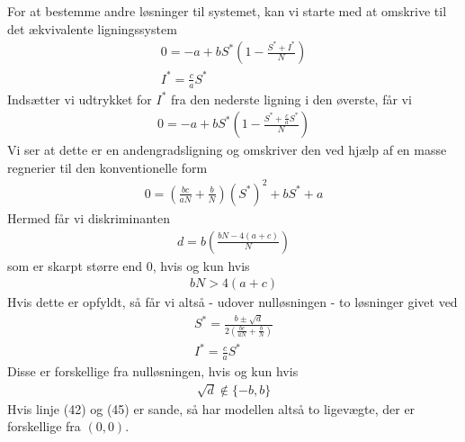 \documentclass[12pt]{article}
\begin{document}
For at bestemme andre løsninger til systemet, kan vi starte med at omskrive til det ækvivalente ligningssystem
\begin{align}
0 = -a + bS^*\left(1 - \frac{S^* + I^*}{N} \right)\\
I^* = \frac{c}{a}S^*
\end{align}
Indsætter vi udtrykket for $I^*$ fra den nederste ligning i den øverste, får vi
\begin{align}
0 = -a + bS^*\left(1 - \frac{S^* + \frac{c}{a}S^*}{N} \right)
\end{align}
Vi ser at dette er en andengradsligning og omskriver den ved hjælp af en masse regnerier til den konventionelle form
\begin{align}
0 = \left(\frac{bc}{aN} + \frac{b}{N} \right)(S^*)^2 + bS^* + a
\end{align}
Hermed får vi diskriminanten
\begin{align}
d = b\left(\frac{bN - 4(a+c)}{N}\right)
\end{align}
som er skarpt større end 0, hvis og kun hvis
\begin{align}
bN > 4(a+c)
\end{align}
Hvis dette er opfyldt, så får vi altså - udover nulløsningen - to løsninger givet ved
\begin{align}
S^* = \frac{b \pm \sqrt{d}}{2\left(\frac{bc}{aN} + \frac{b}{N} \right)}\\
I^* = \frac{c}{a}S^*
\end{align}
Disse er forskellige fra nulløsningen, hvis og kun hvis
\begin{align}
\sqrt{d} \notin \{-b,b\}
\end{align}
Hvis linje (42) og (45) er sande, så har modellen altså to ligevægte, der er forskellige fra $(0,0)$. 
\end{document}
